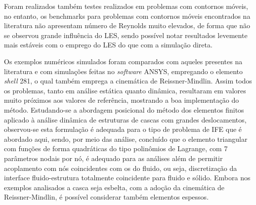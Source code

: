 Foram realizados também testes realizados em problemas com contornos móveis, no entanto, os benchmarks para problemas com contornos móveis encontrados na literatura não apresentam número de Reynolds muito elevados, de forma que não se observou grande influência do LES, sendo possível notar resultados levemente mais estáveis com o emprego do LES do que com a simulação direta. 

Os exemplos numéricos simulados foram comparados com aqueles presentes na literatura e com simulações feitas no \textit{software} ANSYS, empregando o elemento \textit{shell} 281, o qual também emprega a cinemática de Reissner-Mindlin. Assim todos os problemas, tanto em análise estática quanto dinâmica, resultaram em valores muito próximos aos valores de referência, mostrando a boa implementação do método.
Estudando-se a abordagem posicional do método dos elementos finitos aplicado à análise dinâmica de estruturas de cascas com grandes deslocamentos,  observou-se esta formulação é adequada para o tipo de problema de IFE que é abordado aqui, sendo, por meio das análise, concluído que o elemento triangular com funções de forma quadráticas do tipo polinômios de Lagrange, com 7 parâmetros nodais por nó, é adequado para as análises além de permitir acoplamento com nós coincidentes com os do fluido, ou seja, discretização da interface fluido-estrutura totalmente coincidente para fluido e sólido. Embora nos exemplos analisados a casca seja esbelta, com a adoção da cinemática de Reissner-Mindlin, é possível considerar também elementos espessos.



